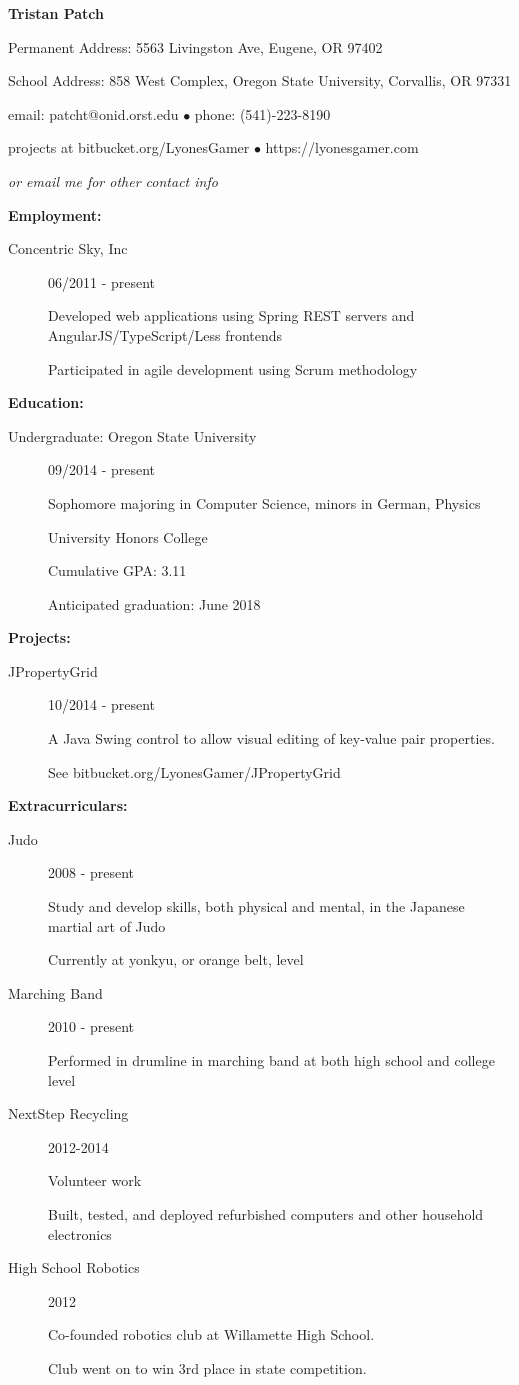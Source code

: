 \documentclass[11pt]{article}
\begin{document}
\centerline{{\LARGE \bf Tristan Patch}}
\bigskip
\centerline{Permanent Address: 5563 Livingston Ave, Eugene, OR 97402}
\centerline{School Address: 858 West Complex, Oregon State University, Corvallis, OR 97331}
\bigskip
\centerline{email: patcht@onid.orst.edu
$\bullet$
phone: (541)-223-8190}
\centerline{projects at bitbucket.org/LyonesGamer
$\bullet$
https://lyonesgamer.com}
\centerline{\emph{or email me for other contact info}}
\bigskip
\hrulefill
\bigskip
{\Large \bf Employment:}
\begin{description}
\item[Concentric Sky, Inc]
\hfill 06/2011 - present

Developed web applications using Spring REST servers and AngularJS/TypeScript/Less frontends

Participated in agile development using Scrum methodology
\end{description}
\smallskip
\hrulefill
\bigskip
{\Large \bf Education:}
\begin{description}
\item[Undergraduate: Oregon State University]
\hfill 09/2014 - present

Sophomore majoring in Computer Science, minors in German, Physics

University Honors College

Cumulative GPA: 3.11

Anticipated graduation: June 2018
\end{description}
\smallskip
\hrulefill
\bigskip
{\Large \bf Projects:}
\begin{description}
\item[JPropertyGrid]
\hfill 10/2014 - present

A Java Swing control to allow visual editing of key-value pair properties.

See bitbucket.org/LyonesGamer/JPropertyGrid
\end{description}
\smallskip
\hrulefill
\bigskip
{\Large \bf Extracurriculars:}
\begin{description}
\item[Judo]
\hfill 2008 - present

Study and develop skills, both physical and mental, in the Japanese martial art of Judo

Currently at yonkyu, or orange belt, level

\item[Marching Band]
\hfill 2010 - present

Performed in drumline in marching band at both high school and college level

\item[NextStep Recycling]
\hfill 2012-2014

Volunteer work

Built, tested, and deployed refurbished computers and other household electronics


\item[High School Robotics]
\hfill 2012

Co-founded robotics club at Willamette High School.

Club went on to win 3rd place in state competition.
\end{description}
\end{document}
